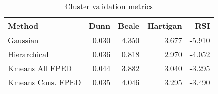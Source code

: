 \begin{table}[h]
\caption{Cluster validation metrics}
\label{tab:cluster_metrics}
\begin{tabular}{lrrrr}
\toprule
Method & Dunn & Beale & Hartigan & RSI \\
\midrule
Gaussian & 0.030 & 4.350 & 3.677 & -5.910 \\
Hierarchical & 0.036 & 0.818 & 2.970 & -4.052 \\
Kmeans All FPED & 0.044 & 3.882 & 3.040 & -3.295 \\
Kmeans Cons. FPED & 0.035 & 4.046 & 3.295 & -3.490 \\
\bottomrule
\end{tabular}
\end{table}
